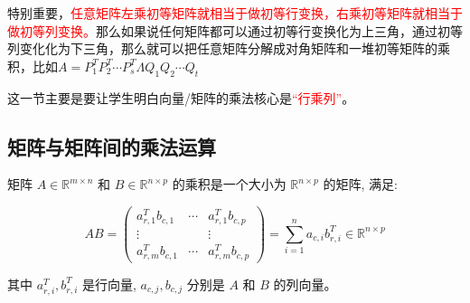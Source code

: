 \begin{proposition}[TODO]
    特别重要，\textcolor{red}{任意矩阵左乘初等矩阵就相当于做初等行变换，右乘初等矩阵就相当于做初等列变换。}那么如果说任何矩阵都可以通过初等行变换化为上三角，通过初等列变化化为下三角，那么就可以把任意矩阵分解成对角矩阵和一堆初等矩阵的乘积，比如$A=P_{1}^{T}P_{2}^{T}\cdots P_{s}^{T}\Lambda Q_{1} Q_{2} \cdots Q_{t}$
\end{proposition}

\begin{note}
这一节主要是要让学生明白向量/矩阵的乘法核心是\textcolor{red}{“行乘列”}。
\end{note}

\subsection{矩阵与矩阵间的乘法运算}

\begin{definition}[矩阵和矩阵的乘法] \label{def:mat-mat-multi}
    
矩阵 $A \in \mathbb{R}^{m \times n}$ 和 $B \in \mathbb{R}^{n \times p}$ 的乘积是一个大小为 $\mathbb{R}^{n \times p}$ 的矩阵, 满足:

$$
A B=\left(\begin{array}{ccc}
a_{r, 1}^T b_{c, 1} & \cdots & a_{r, 1}^T b_{c, p} \\
\vdots & & \vdots \\
a_{r, m}^T b_{c, 1} & \cdots & a_{r, m}^T b_{c, p}
\end{array}\right)=\sum_{i=1}^n a_{c, i} b_{r, i}^T \in \mathbb{R}^{n \times p}
$$

其中 $a_{r, i}^T, b_{r, i}^T$ 是行向量, $a_{c, j}, b_{c, j}$ 分别是 $A$ 和 $B$ 的列向量。
\end{definition}

